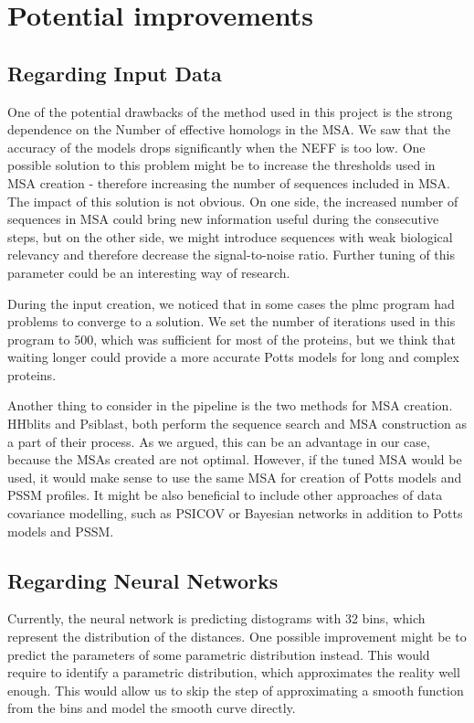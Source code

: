 \section{Potential improvements}

\subsection{Regarding Input Data}
One of the potential drawbacks of the method used in this project is the strong dependence on the Number of effective homologs in the MSA.
We saw that the accuracy of the models drops significantly when the NEFF is too low.
One possible solution to this problem might be to increase the thresholds used in MSA creation - therefore increasing the number of sequences included in MSA.
The impact of this solution is not obvious.
On one side, the increased number of sequences in MSA could bring new information useful during the consecutive steps, but on the other side, we might introduce sequences with weak biological relevancy and therefore decrease the signal-to-noise ratio.
Further tuning of this parameter could be an interesting way of research.

During the input creation, we noticed that in some cases the plmc program had problems to converge to a solution.
We set the number of iterations used in this program to 500, which was sufficient for most of the proteins, but we think that waiting longer could provide a more accurate Potts models for long and complex proteins.

Another thing to consider in the pipeline is the two methods for MSA creation.
HHblits and Psiblast, both perform the sequence search and MSA construction as a part of their process.
As we argued, this can be an advantage in our case, because the MSAs created are not optimal.
However, if the tuned MSA would be used, it would make sense to use the same MSA for creation of Potts models and PSSM profiles.
It might be also beneficial to include other approaches of data covariance modelling, such as PSICOV or Bayesian networks in addition to Potts models and PSSM.

\subsection{Regarding Neural Networks}
Currently, the neural network is predicting distograms with 32 bins, which represent the distribution of the distances.
One possible improvement might be to predict the parameters of some parametric distribution instead.
This would require to identify a parametric distribution, which approximates the reality well enough.
This would allow us to skip the step of approximating a smooth function from the bins and model the smooth curve directly.

